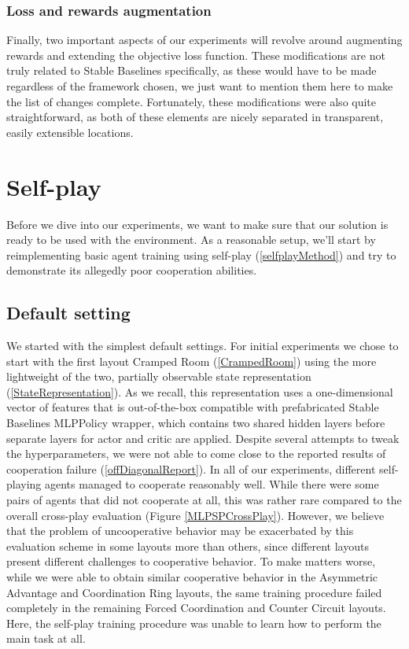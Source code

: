 \subsubsection*{Loss and rewards augmentation}
Finally, two important aspects of our experiments will revolve around augmenting rewards and extending the objective loss function.
These modifications are not truly related to Stable Baselines specifically, as these would have to be made regardless of the framework chosen, we just want to mention them here to make the list of changes complete. 
Fortunately, these modifications were also quite straightforward, as both of these elements are nicely separated in transparent, easily extensible locations.

\section{Self-play}
Before we dive into our experiments, we want to make sure that our solution is ready to be used with the environment.
As a reasonable setup, we'll start by reimplementing basic agent training using self-play (\ref{selfplayMethod}) and try to demonstrate its allegedly poor cooperation abilities.


\subsection*{Default setting}
We started with the simplest default settings.
For initial experiments we chose to start with the first layout Cramped Room (\ref{CrampedRoom}) using the more lightweight of the two, partially observable state representation (\ref{StateRepresentation}).
As we recall, this representation uses a one-dimensional vector of features that is out-of-the-box compatible with prefabricated Stable Baselines MLPPolicy wrapper, which contains two shared hidden layers before separate layers for actor and critic are applied.
Despite several attempts to tweak the hyperparameters, we were not able to come close to the reported results of cooperation failure (\ref{offDiagonalReport}).
In all of our experiments, different self-playing agents managed to cooperate reasonably well.
While there were some pairs of agents that did not cooperate at all, this was rather rare compared to the overall cross-play evaluation (Figure \ref{MLPSPCrossPlay}).
However, we believe that the problem of uncooperative behavior may be exacerbated by this evaluation scheme in some layouts more than others, since different layouts present different challenges to cooperative behavior.
To make matters worse, while we were able to obtain similar cooperative behavior in the Asymmetric Advantage and Coordination Ring layouts, the same training procedure failed completely in the remaining Forced Coordination and Counter Circuit layouts.
Here, the self-play training procedure was unable to learn how to perform the main task at all.

